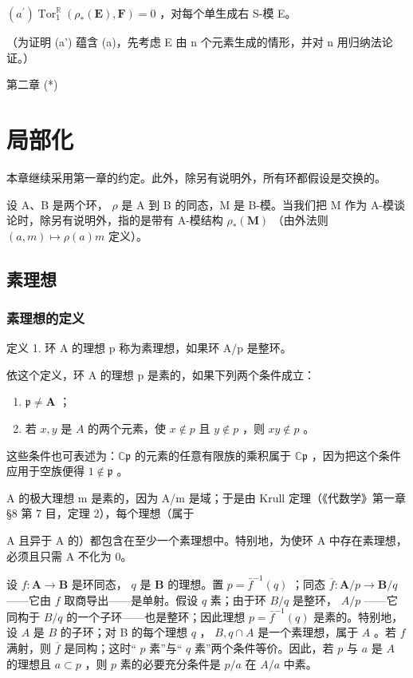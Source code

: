 \((a^{\prime})\operatorname{Tor}_{1}^{\mathbb{R}}(\rho_{*}(\mathbf{E}),\mathbf{F}) = 0\) ，对每个单生成右 S-模 E。

（为证明 (a') 蕴含 (a)，先考虑 E 由 n 个元素生成的情形，并对 n 用归纳法论证。）

第二章 (*)

\chapter{局部化}

本章继续采用第一章的约定。此外，除另有说明外，所有环都假设是交换的。

设 A、B 是两个环， \(\rho\) 是 A 到 B 的同态，M 是 B-模。当我们把 M 作为 A-模谈论时，除另有说明外，指的是带有 A-模结构 \(\rho_{*}(\mathbf{M})\) （由外法则 \((a,m)\mapsto\rho(a)m\) 定义）。

\section{素理想}

\subsection{素理想的定义}

定义 1. 环 A 的理想 p 称为素理想，如果环 A/p 是整环。

依这个定义，环 A 的理想 p 是素的，如果下列两个条件成立：

\begin{enumerate}
\def\labelenumi{(\arabic{enumi})}
\item
  \(\mathfrak{p} \neq \mathbf{A}\) ；
\item
  若 \(x, y\) 是 \(A\) 的两个元素，使 \(x \notin p\) 且 \(y \notin p\) ，则 \(xy \notin p\) 。
\end{enumerate}

这些条件也可表述为：\(\mathbb{C}\mathfrak{p}\) 的元素的任意有限族的乘积属于 \(\mathbb{C}\mathfrak{p}\) ，因为把这个条件应用于空族便得 \(1\notin\mathfrak{p}\) 。

A 的极大理想 m 是素的，因为 A/m 是域；于是由 Krull 定理（《代数学》第一章 §8 第 7 目，定理 2），每个理想（属于

A 且异于 A 的）都包含在至少一个素理想中。特别地，为使环 A 中存在素理想，必须且只需 A 不化为 0。

设 \(f: \mathbf{A} \to \mathbf{B}\) 是环同态， \(q\) 是 \(\mathbf{B}\) 的理想。置 \(p = \bar{f}^{-1}(q)\) ；同态 \(\overline{f}: \mathbf{A}/p \to \mathbf{B}/q\) ——它由 \(f\) 取商导出——是单射。假设 \(q\) 素；由于环 \(B/q\) 是整环， \(A/p\) ——它同构于 \(B/q\) 的一个子环——也是整环；因此理想 \(p = \bar{f}^{-1}(q)\) 是素的。特别地，设 \(A\) 是 \(B\) 的子环；对 B 的每个理想 \(q\) ， \(B, q \cap A\) 是一个素理想，属于 \(A\) 。若 \(f\) 满射，则 \(\overline{f}\) 是同构；这时`` \(p\) 素''与`` \(q\) 素''两个条件等价。因此，若 \(p\) 与 \(a\) 是 \(A\) 的理想且 \(a \subset p\) ，则 \(p\) 素的必要充分条件是 \(p/a\) 在 \(A/a\) 中素。

